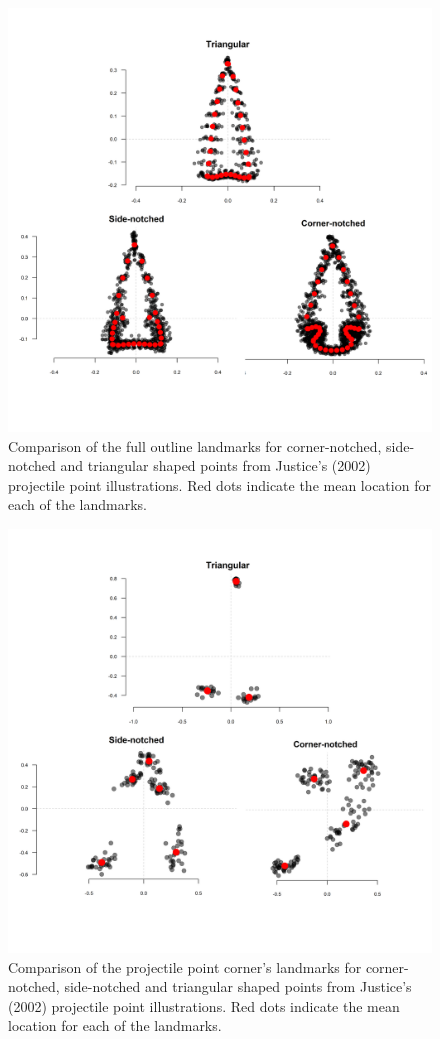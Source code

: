 \documentclass[a4paper]{article}
\begin{document}
\begin{figure}
\includegraphics[width=1\linewidth]{figures/curveComparison} \caption{Comparison of the full outline landmarks for corner-notched, side-notched and triangular shaped points from Justice's (2002) projectile point illustrations. Red dots indicate the mean location for each of the landmarks.}\label{fig:curvesStack}
\end{figure}

\begin{figure}
\includegraphics[width=1\linewidth]{figures/cornerComparison} \caption{Comparison of the projectile point corner's landmarks for corner-notched, side-notched and triangular shaped points from Justice's (2002) projectile point illustrations. Red dots indicate the mean location for each of the landmarks.}\label{fig:cornerComparison}
\end{figure}
\end{document}
